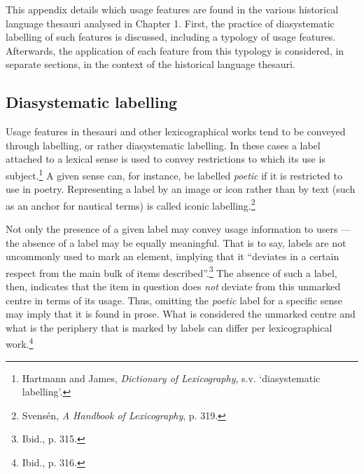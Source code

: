 This appendix details which usage features are found in the various historical language thesauri analysed in Chapter 1. First, the practice of diasystematic labelling of such features is discussed, including a typology of usage features. Afterwards, the application of each feature from this typology is considered, in separate sections, in the context of the historical language thesauri.

\subsection*{Diasystematic labelling}
\label{sect:Stolk_thes-content:diasystematic-labelling}

Usage features in thesauri and other lexicographical works tend to be conveyed through labelling, or rather diasystematic labelling. In these cases a label attached to a lexical sense is used to convey restrictions to which its use is subject.\footnote{Hartmann and James, \textit{Dictionary of Lexicography}, s.v. `diasystematic labelling'.} %
A given sense can, for instance, be labelled \textit{poetic} if it is restricted to use in poetry. Representing a label by an image or icon rather than by text (such as an anchor for nautical terms) is called iconic labelling.\footnote{Svensén, \textit{A Handbook of Lexicography}, p. 319.} 

Not only the presence of a given label may convey usage information to users --- the absence of a label may be equally meaningful. That is to say, labels are not uncommonly used to mark an element, implying that it ``deviates in a certain respect from the main bulk of items described''.\footnote{%
Ibid., p. 315.} The absence of such a label, then, indicates that the item in question does \textit{not} deviate from this unmarked centre in terms of its usage. Thus, omitting the \textit{poetic} label for a specific sense may imply that it is found in prose. What is considered the unmarked centre and what is the periphery that is marked by labels can differ per lexicographical work.\footnote{%
Ibid., p. 316.} 

